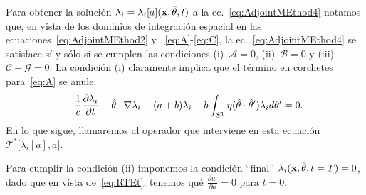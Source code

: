 Para obtener la solución  $\lambda_i=\lambda_i[a](\mathbf{x},\hat{\theta},t)$ 
a la ec.~\eqref{eq:AdjointMEthod4} notamos que, en vista 
de los dominios de integración espacial en las ecuaciones~\eqref{eq:AdjointMEthod2} 
y ~\eqref{eq:A}-\eqref{eq:C}, la ec.~\eqref{eq:AdjointMEthod4} 
se satisface sí y sólo sí se cumplen 
las condiciones (i)~$\mathcal{A}=0$, (ii)~$\mathcal{B}=0$ y
(iii)~$\mathcal{C}-\mathcal{G}=0$. La condición (i) claramente implica 
que el término en corchetes para~\eqref{eq:A} se anule:
\begin{equation}
-\frac{1}
{c}\frac{\partial \lambda_i}{\partial t} 
- \hat{\theta} \cdot \nabla \lambda_i+ (a+b)\lambda_i 
- b\int_{S^1}
\eta(\hat{\theta}\cdot\hat{\theta} ') \lambda_i d\theta'=0.
\label{condA}
\end{equation}
En lo que sigue, llamaremos al operador que interviene en esta ecuación $\mathcal{T}^*\big[\lambda_i[a],a\big]$.

Para cumplir la condición (ii) imponemos la condición ``final'' $\lambda_i(\mathbf{x},\hat{\theta},t=T)=0$, 
dado que en vista de~\eqref{eq:RTEt}, tenemos qué $\frac{\partial u_i}{\partial a} = 0$ 
para $t=0$. 

